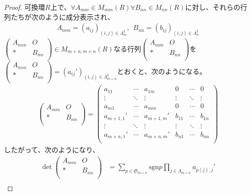 \documentclass[dvipdfmx]{jsarticle}
\begin{document}
\begin{proof}
可換環$R$上で、$\forall A_{mm} \in M_{mm}(R)\forall B_{nn} \in M_{nn}(R)$に対し、それらの行列たちが次のように成分表示され、
\begin{align*}
A_{mm} = \left( a_{ij} \right)_{(i,j) \in \varLambda_{m}^{2}},\ \ B_{nn} = \left( b_{ij} \right)_{(i,j) \in \varLambda_{n}^{2}}
\end{align*}
$\begin{pmatrix}
A_{mm} & O \\
* & B_{nn} \\
\end{pmatrix} \in M_{m + n,m + n}(R)$なる行列$\begin{pmatrix}
A_{mm} & O \\
* & B_{nn} \\
\end{pmatrix}$を$\begin{pmatrix}
A_{mm} & O \\
* & B_{nn} \\
\end{pmatrix} = \left( a_{ij}' \right)_{(i,j) \in \varLambda_{m + n}^{2}}$とおくと、次のようになる。
\begin{align*}
\begin{pmatrix}
A_{mm} & O \\
* & B_{nn} \\
\end{pmatrix} = \begin{pmatrix}
a_{11} & \cdots & a_{1m} & 0 & \cdots & 0 \\
 \vdots & \ddots & \vdots & \vdots & \ddots & \vdots \\
a_{m1} & \cdots & a_{mm} & 0 & \cdots & 0 \\
a_{m + 1,1}' & \cdots & a_{m + 1,m}' & b_{11} & \cdots & b_{1n} \\
 \vdots & \ddots & \vdots & \vdots & \ddots & \vdots \\
a_{m + n,1}' & \cdots & a_{m + n,m}' & b_{n1} & \cdots & b_{nn} \\
\end{pmatrix}
\end{align*}
したがって、次のようになり、
\begin{align*}
\det\begin{pmatrix}
A_{mm} & O \\
* & B_{nn} \\
\end{pmatrix} &= \sum_{p \in \mathfrak{S}_{m + n}} {{\mathrm{sgn} }p\prod_{j \in \varLambda_{m + n}} a_{p(j),j}'}\\

\end{align*}
\end{proof}
\end{document}
